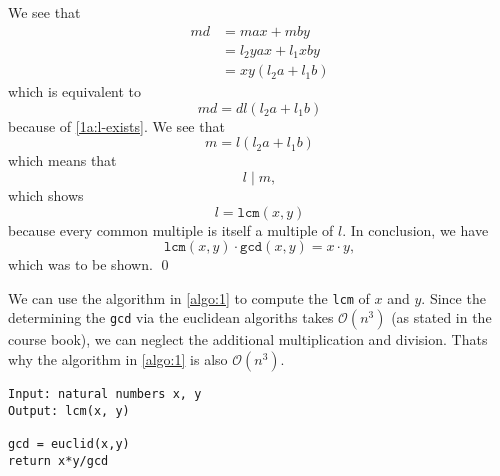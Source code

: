 \documentclass[12pt]{article}
\begin{document}
\begin{equation}
 \end{equation} We see that \begin{align}
 	md&=max+mby\\
 	&=l_2yax+l_1xby\\
 	&=xy(l_2a+l_1b)	
 \end{align} which is equivalent to \begin{equation}
 	md=dl(l_2a+l_1b)
 \end{equation} because of \autoref{1a:l-exists}. We see that \begin{equation}
 	m=l(l_2a+l_1b)
 \end{equation} which means that \begin{equation}
 	l\mid m,
 \end{equation} which shows \begin{equation}
 	l=\texttt{lcm}(x,y)
 \end{equation} because every common multiple is itself a multiple of $l$. In conclusion, we have \begin{equation}
 	\texttt{lcm}(x,y)\cdot\texttt{gcd}(x,y)=x\cdot y,
 \end{equation} which was to be shown. \qed
 
 We can use the algorithm in \autoref{algo:1} to compute the \texttt{lcm} of $x$ and $y$. Since the determining the \texttt{gcd} via the euclidean algoriths takes $\mathcal{O}(n^3)$ (as stated in the course book), we can neglect the additional multiplication and division. Thats why the algorithm in \autoref{algo:1} is also $\mathcal{O}(n^3)$.
 
 \begin{lstlisting}[caption={Algorithm to compute \texttt{lcm}(x,y)},label={algo:1}]
Input: natural numbers x, y
Output: lcm(x, y)

gcd = euclid(x,y)
return x*y/gcd
 \end{lstlisting}
 
\end{document}
